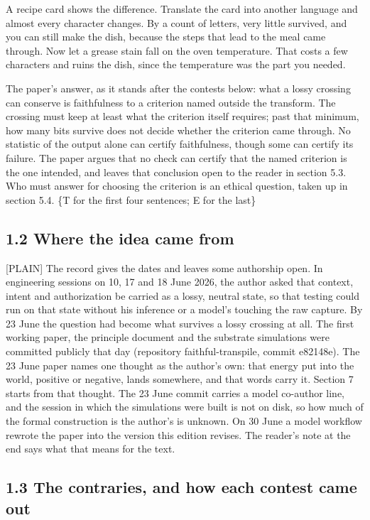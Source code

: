\documentclass[11pt]{article}
\newcommand{\register}[1]{{\ttfamily\small #1}}
\begin{document}
A recipe card shows the difference. Translate the card into another language and almost every character changes. By a count of letters, very little survived, and you can still make the dish, because the steps that lead to the meal came through. Now let a grease stain fall on the oven temperature. That costs a few characters and ruins the dish, since the temperature was the part you needed.

The paper's answer, as it stands after the contests below: what a lossy crossing can conserve is faithfulness to a criterion named outside the transform. The crossing must keep at least what the criterion itself requires; past that minimum, how many bits survive does not decide whether the criterion came through. No statistic of the output alone can certify faithfulness, though some can certify its failure. The paper argues that no check can certify that the named criterion is the one intended, and leaves that conclusion open to the reader in section 5.3. Who must answer for choosing the criterion is an ethical question, taken up in section 5.4. \{T for the first four sentences; E for the last\}

\subsection*{1.2 Where the idea came from}

\register{[PLAIN]} The record gives the dates and leaves some authorship open. In engineering sessions on 10, 17 and 18 June 2026, the author asked that context, intent and authorization be carried as a lossy, neutral state, so that testing could run on that state without his inference or a model's touching the raw capture. By 23 June the question had become what survives a lossy crossing at all. The first working paper, the principle document and the substrate simulations were committed publicly that day (repository faithful-transpile, commit e82148e). The 23 June paper names one thought as the author's own: that energy put into the world, positive or negative, lands somewhere, and that words carry it. Section 7 starts from that thought. The 23 June commit carries a model co-author line, and the session in which the simulations were built is not on disk, so how much of the formal construction is the author's is unknown. On 30 June a model workflow rewrote the paper into the version this edition revises. The reader's note at the end says what that means for the text.

\subsection*{1.3 The contraries, and how each contest came out}
\end{document}

